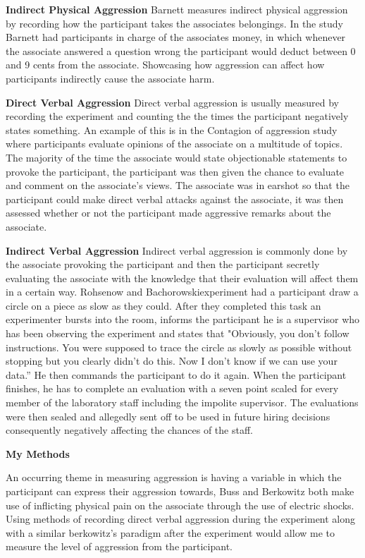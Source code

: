 \documentclass[journal]{IEEEtran}
\begin{document}
    \textbf{Indirect Physical Aggression}
        Barnett measures indirect physical aggression by recording how the participant takes the associates belongings\cite{Barnett}. In the study Barnett had participants in charge of the associates money, in which whenever the associate answered a question wrong the participant would deduct between 0 and 9 cents from the associate. Showcasing how aggression can affect how participants indirectly cause the associate harm.

    \textbf{Direct Verbal Aggression}
        Direct verbal aggression is usually measured by recording the experiment and counting the the times the participant negatively states something. An example of this is in the Contagion of aggression study where participants evaluate opinions of the associate on a multitude of topics\cite{Wheeler}. The majority of the time the associate would state objectionable statements to provoke the participant, the participant was then given the chance to evaluate and comment on the associate's views. The associate was in earshot so that the participant could make direct verbal attacks against the associate, it was then assessed whether or not the participant made aggressive remarks about the associate.

    \textbf{Indirect Verbal Aggression}
        Indirect verbal aggression is commonly done by the associate provoking the participant and then the participant secretly evaluating the associate with the knowledge that their evaluation will affect them in a certain way. Rohsenow and Bachorowskiexperiment had a participant draw a circle on a piece as slow as they could\cite{Rohsenow}. After they completed this task an experimenter bursts into the room, informs the participant he is a supervisor who has been observing the experiment and states that "Obviously, you don't follow instructions. You were supposed to trace the circle as slowly as possible without stopping but you clearly didn't do this. Now I don't know if we can use your data.” He then commands the participant to do it again. When the participant finishes, he has to complete an evaluation with a seven point scaled for every member of the laboratory staff including the impolite supervisor. The evaluations were then sealed and allegedly sent off to be used in future hiring decisions consequently negatively affecting the chances of the staff.

    \textbf{My Methods}
    
    An occurring theme in measuring aggression is having a variable in which the participant can express their aggression towards, Buss and Berkowitz both make use of inflicting physical pain on the associate through the use of electric shocks. Using methods of recording direct verbal aggression during the experiment along with a similar berkowitz’s paradigm after the experiment would allow me to measure the level of aggression from the participant. 
    
\end{document}
